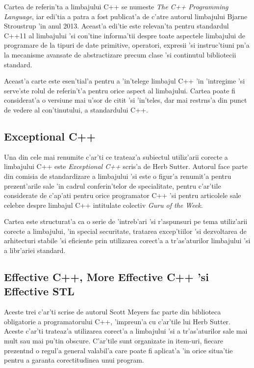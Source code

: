 Cartea de referin'ta a limbajului C++ se numeste \emph{The C++ Programming Language}, iar edi'tia a patra a fost publicat'a de c'atre autorul limbajului Bjarne Stroustrup 'in anul 2013. Aceast'a edi'tie este relevan'ta pentru standardul C++11 al limbajului 'si con'tine informa'tii despre toate aspectele limbajului de programare de la tipuri de date primitive, operatori, expresii 'si instruc'tiuni p{\ia}n'a la mecanisme avansate de abstractizare precum clase 'si continutul bibliotecii standard.

\medskip

Aceast'a carte este esen'tial'a pentru a 'in'telege limbajul C++ 'in 'intregime 'si serve'ste rolul de referin't'a pentru orice aspect al limbajului. Cartea poate fi considerat'a o versiune mai u'sor de citit 'si 'in'teles, dar mai restr{\ia}ns'a din punct de vedere al con'tinutului, a standardului C++.

\subsection{Exceptional C++}

Una din cele mai renumite c'ar'ti ce trateaz'a subiectul utiliz'arii corecte a limbajului C++ este \emph{Exceptional C++}\cite{exceptional_cpp} scris'a de Herb Sutter. Autorul face parte din comisia de standardizare a limbajului 'si este o figur'a renumit'a pentru prezent'arile sale 'in cadrul conferin'telor de specialitate, pentru c'ar'tile considerate de c'ap'at{\ia}i pentru orice programator C++ 'si pentru articolele sale celebre despre limbajul C++ intitulate colectiv \emph{Guru of the Week}.

\medskip

Cartea este structurat'a ca o serie de 'intreb'ari 'si r'aspunsuri pe tema utiliz'arii corecte a limbajului, 'in special securitate, tratarea excep'tiilor 'si dezvoltarea de arhitecturi stabile 'si eficiente prin utilizarea corect'a a tr'as'aturilor limbajului 'si a libr'ariei standard.

\subsection{Effective C++, More Effective C++ 'si Effective STL}

Aceste trei c'ar'ti\cite{effective_cpp}\cite{more_effective_cpp}\cite{effective_stl} scrise de autorul Scott Meyers fac parte din biblioteca obligatorie a programatorului C++, 'impreun'a cu c'ar'tile lui Herb Sutter. Aceste c'ar'ti trateaz'a utilizarea corect'a a limbajului 'si a tr'as'aturilor sale mai mult sau mai pu'tin obscure. C'ar'tile sunt organizate in item-uri, fiecare prezent{\ia}nd o regul'a general valabil'a care poate fi aplicat'a 'in orice situa'tie pentru a garanta corectitudinea unui program.

